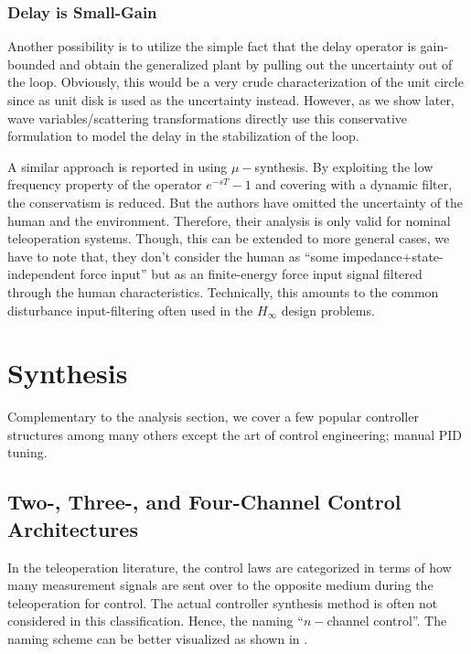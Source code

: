 \subsubsection{Delay is Small-Gain}
Another possibility is to utilize the simple fact that the delay operator is gain-bounded and obtain the 
generalized plant by pulling out the uncertainty out of the loop. Obviously, this would be a very crude
characterization of the unit circle since as unit disk is used as the uncertainty instead. However, as 
we show later, wave variables/scattering transformations directly use this conservative formulation to 
model the delay in the stabilization of the loop.

A similar approach is reported in \cite{leungfa} using $\mu-$synthesis. By exploiting the
low frequency property of the operator $e^{-sT}-1$ and covering with a dynamic filter, the conservatism
is reduced. But the authors have omitted the uncertainty of the human and the environment. Therefore, 
their analysis is only valid for nominal teleoperation systems. Though, this can be extended to more 
general cases, we have to note that, they don't consider the human as \enquote{some impedance$+$state-independent 
force input} but as an finite-energy force input signal filtered through the human characteristics. 
Technically, this amounts to the common disturbance input-filtering often used in the $H_\infty$ design problems. 

 




\section{Synthesis}

Complementary to the analysis section, we cover a few popular controller structures among many others except the 
art of control engineering; manual PID tuning. 

\subsection{Two-, Three-, and Four-Channel Control Architectures}
In the teleoperation literature, the control laws are categorized in terms of how many measurement signals 
are sent over to the opposite medium during the teleoperation for control. The actual controller synthesis 
method is often not considered in this classification.  Hence, the naming \enquote{$n-$channel control}. The naming 
scheme can be better visualized as shown in . 


